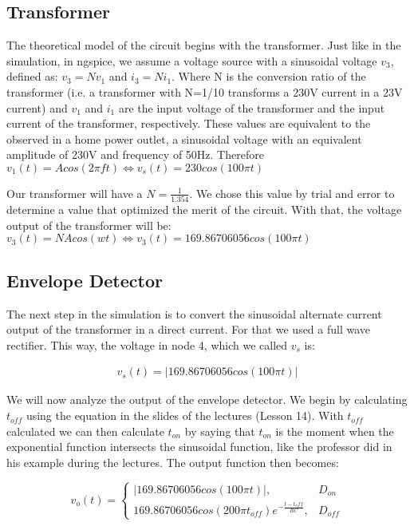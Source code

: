\subsection{Transformer}
\hspace{12pt} The theoretical model of the circuit begins with the transformer. Just like in the simulation, in ngspice, we assume a voltage source with a sinusoidal voltage $v_3$, defined as: $v_3 = Nv_1$ and $i_3 = Ni_1$.
Where N is the conversion ratio of the transformer (i.e. a transformer with N=1/10 transforms a 230V current in a 23V current) and $v_1$ and $i_1$ are the input voltage of the transformer and the input current of the transformer, respectively. These values are equivalent to the observed in a home power outlet, a sinusoidal voltage with an equivalent amplitude of 230V and frequency of 50Hz. Therefore $v_1(t) = Acos(2\pi ft) \iff v_s(t) = 230cos(100\pi t)$

Our transformer will have a $N=\frac{1}{1.354}$. We chose this value by trial and error to determine a value that optimized the merit of the circuit. With that, the voltage output of the transformer will be: $v_3(t) = NAcos(wt) \iff v_3(t) = 169.86706056cos(100\pi t)$

\subsection{Envelope Detector}
\hspace{12pt}The next step in the simulation is to convert the sinusoidal alternate current output of the transformer in a direct current. For that we used a full wave rectifier. This way, the voltage in node 4, which we called $v_s$ is:

\vspace{-15pt}
\begin{gather}
    v_s(t) = |169.86706056cos(100\pi t)| \nonumber
\end{gather}

We will now analyze the output of the envelope detector. We begin by calculating $t_{off}$ using the equation in the slides of the lectures (Lesson 14). With $t_{off}$ calculated we can then calculate $t_{on}$ by saying that $t_{on}$ is the moment when the exponential function intersects the sinusoidal function, like the professor did in his example during the lectures. The output function then becomes:

\vspace{-8pt}
\[ 
v_o(t)= \left.
\begin{cases} 
	|169.86706056cos(100\pi t)|, & D_{on} \\
	169.86706056cos(200\pi t_{off})e^{-\frac{t-t_off}{RC}}, & D_{off}
\end{cases}
\right.
\]

